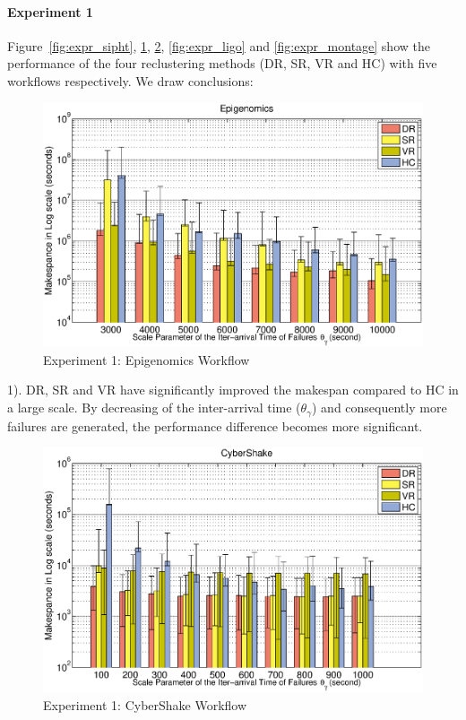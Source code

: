 \documentclass{IOS-Book-Article}
\begin{document}
\paragraph{\textbf{Experiment 1}}
Figure~\ref{fig:expr_sipht}, \ref{fig:expr_genome}, \ref{fig:expr_cybershake}, \ref{fig:expr_ligo} and \ref{fig:expr_montage} show the performance of the four reclustering methods (DR, SR, VR and HC) with five workflows respectively. We draw conclusions: 

\begin{figure}[!htb]
\centering
  \includegraphics[width=1.0\linewidth]{genome.eps}
  \caption{Experiment 1: Epigenomics Workflow}
  \label{fig:expr_genome}
\end{figure}


1). DR, SR and VR have significantly improved the makespan compared to HC in a large scale. By decreasing of the inter-arrival time ($\theta_{\gamma}$) and consequently more failures are generated, the performance difference becomes more significant. 


\begin{figure}[!htb]
\centering
  \includegraphics[width=1.0\linewidth]{cybershake.eps}
  \caption{Experiment 1: CyberShake Workflow}
  \label{fig:expr_cybershake}
\end{figure}
\end{document}
